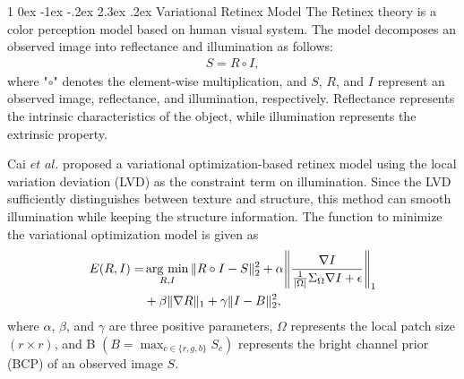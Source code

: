\documentclass[a4paper,twocolumn,10pt]{article}
\makeatletter
\newcommand{\argmin}{\mathop{\rm arg~min}\limits}
\renewcommand{\section}{%
  \@startsection{section}%
   {1}%
   {\z@}%
   {0ex \@plus -1ex \@minus -.2ex}%
   {2.3ex \@plus.2ex}%
   {\normalfont\large\bfseries}%
}%
\makeatother
\begin{document}
\section{Variational Retinex Model}
\vspace{-0.3cm}
The Retinex theory \cite{retinex} is a color perception model based on human visual system. 
The model decomposes an observed image into reflectance and illumination as follows:
\begin{eqnarray}
S = R \circ I, \label{eq:retinex}
\end{eqnarray}
where "$\circ$" denotes the element-wise multiplication, and $S$, $R$, and $I$ represent an observed image, reflectance, and illumination, respectively. Reflectance represents the intrinsic characteristics of the object, while illumination represents the extrinsic property.\par 
Cai $et$ $al.$ \cite{jiep} proposed a variational optimization-based retinex model using the local variation deviation (LVD) as the constraint term on illumination. Since the LVD sufficiently distinguishes between texture and structure, this method can smooth illumination while keeping the structure information. The function to minimize the variational optimization model is given as
\vspace{-0.3cm}
\begin{eqnarray}
	\begin{split}
		E(R, I) = & \argmin_{R, I} \|R \circ I - S\|_{2}^{2} + \alpha{\left \|\frac{\nabla{I}}{\frac{1}{|\Omega|}\Sigma_{\Omega}\nabla{I} + \epsilon} \right\|_{1}}\\
		&+ \beta{\|\nabla{R}\|_{1}} + \gamma{\|I - B\|_{2}^{2}},
	\end{split}
\end{eqnarray}
where $\alpha$, $\beta$, and $\gamma$ are three positive parameters, $\Omega$ represents the local patch size $(r \times r)$, and B $(B=\max_{c \in \{r, g, b\}}{S_{c}})$ represents the bright channel prior (BCP) of an observed image $S$.
\vspace{0.1cm}
\end{document}
